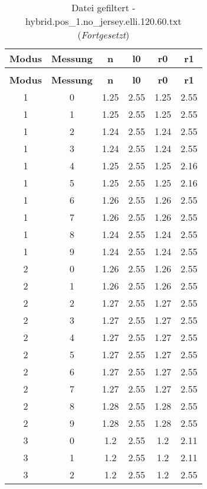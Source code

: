 \begin{longtable}{|c|c||c||c||c|c|}
	\caption{Datei gefiltert - hybrid.pos\_1.no\_jersey.elli.120.60.txt} \label{tab:hybrid.pos-1.no-jersey.elli.120.60.txt} \\ \hline
	\textbf{Modus} & \textbf{Messung} & \textbf{n} & \textbf{l0} & \textbf{r0} & \textbf{r1}\\ \hline
	\endfirsthead
	\caption[]{Datei gefiltert - hybrid.pos\_1.no\_jersey.elli.120.60.txt (\emph{Fortgesetzt})} \\ \hline
	\textbf{Modus} & \textbf{Messung} & \textbf{n} & \textbf{l0} & \textbf{r0} & \textbf{r1}\\ \hline
	\endhead
	1 & 0 & 1.25 & 2.55 & 1.25 & 2.55 \\ \hline
	1 & 1 & 1.25 & 2.55 & 1.25 & 2.55 \\ \hline
	1 & 2 & 1.24 & 2.55 & 1.24 & 2.55 \\ \hline
	1 & 3 & 1.24 & 2.55 & 1.24 & 2.55 \\ \hline
	1 & 4 & 1.25 & 2.55 & 1.25 & 2.16 \\ \hline
	1 & 5 & 1.25 & 2.55 & 1.25 & 2.16 \\ \hline
	1 & 6 & 1.26 & 2.55 & 1.26 & 2.55 \\ \hline
	1 & 7 & 1.26 & 2.55 & 1.26 & 2.55 \\ \hline
	1 & 8 & 1.24 & 2.55 & 1.24 & 2.55 \\ \hline
	1 & 9 & 1.24 & 2.55 & 1.24 & 2.55 \\ \hline
	2 & 0 & 1.26 & 2.55 & 1.26 & 2.55 \\ \hline
	2 & 1 & 1.26 & 2.55 & 1.26 & 2.55 \\ \hline
	2 & 2 & 1.27 & 2.55 & 1.27 & 2.55 \\ \hline
	2 & 3 & 1.27 & 2.55 & 1.27 & 2.55 \\ \hline
	2 & 4 & 1.27 & 2.55 & 1.27 & 2.55 \\ \hline
	2 & 5 & 1.27 & 2.55 & 1.27 & 2.55 \\ \hline
	2 & 6 & 1.27 & 2.55 & 1.27 & 2.55 \\ \hline
	2 & 7 & 1.27 & 2.55 & 1.27 & 2.55 \\ \hline
	2 & 8 & 1.28 & 2.55 & 1.28 & 2.55 \\ \hline
	2 & 9 & 1.28 & 2.55 & 1.28 & 2.55 \\ \hline
	3 & 0 & 1.2 & 2.55 & 1.2 & 2.11 \\ \hline
	3 & 1 & 1.2 & 2.55 & 1.2 & 2.11 \\ \hline
	3 & 2 & 1.2 & 2.55 & 1.2 & 2.55 \\ \hline

\end{longtable}
